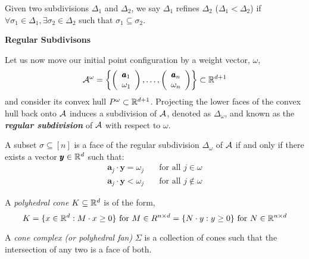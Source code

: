 \begin{definition}
    Given two subdivisions $\Delta_1$ and $\Delta_2$, we say $\Delta_1$ refines $\Delta_2$ ($\Delta_1 < \Delta_2$) if $\forall \sigma_1 \in \Delta_1, \exists \sigma_2 \in \Delta_2$ such that $\sigma_1 \subseteq \sigma_2$.
\end{definition}

\textbf{Regular Subdivisons}

Let us now move our initial point configuration by a weight vector, $\omega$,
$$\mathcal{A}^{\omega} = \left\{ \left( \begin{array}{c} \pmb{a}_1 \\ \omega_1 \end{array} \right), \dots, \left( \begin{array}{c} \pmb{a}_n \\ \omega_n \end{array} \right) \right\} \subset \mathbb{R}^{d+1}$$
and consider its convex hull $P^{\omega} \subset \mathbb{R}^{d+1}$.
Projecting the lower faces of the convex hull back onto $\mathcal{A}$ induces a subdivision of $\mathcal{A}$, denoted as $\Delta_{\omega}$, and known as the \textbf{\textit{regular subdivision}} of $\mathcal{A}$ with respect to $\omega$.

\begin{definition}
    A subset $\sigma \subseteq [n]$ is a face of the regular subdivision $\Delta_{\omega}$ of $\mathcal{A}$ if and only if there exists a vector $\pmb{y} \in \mathbb{R}^d$ such that:
    \begin{equation*}
        \begin{split}
             \pmb{a}_j \cdot \pmb{y} = \omega_j & \quad \text{for all  } j \in \omega \\
             \pmb{a}_j \cdot \pmb{y} < \omega_j & \quad \text{for all  } j \not\in \omega
        \end{split}
    \end{equation*}
\end{definition}

\begin{definition}
    A \textit{polyhedral cone} $K \subseteq \mathbb{R}^d$ is of the form,
    $$K = \{x \in \mathbb{R}^d : M \cdot x \geq 0 \} \text{  for  } M \in R^{n\times d} = \{ N \cdot y : y \geq 0 \} \text{  for  } N \in \mathbb{R}^{n \times d}$$
\end{definition}

\begin{definition}
    A \textit{cone complex (or polyhedral fan)} $\Sigma$ is a collection of cones such that the intersection of any two is a face of both.
\end{definition}

